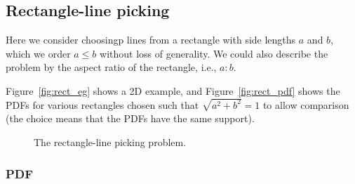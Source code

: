 \subsection{Rectangle-line picking}
\label{sec:rectangle_line}


Here we consider choosingp lines from a rectangle with side lengths
$a$ and $b$, which we order $a \leq b$ without loss of generality. 
We could also describe the problem by the aspect ratio of the
rectangle, i.e., $a:b$.

Figure~\ref{fig:rect_eg} shows a 2D example, and
Figure~\ref{fig:rect_pdf} shows the PDFs for various rectangles chosen
such that $\sqrt{a^2 + b^2} = 1$ to allow comparison (the choice means
that the PDFs have the same support).

\begin{figure}[tbp]
  \begin{center}
    \hspace{6mm}
    \caption{The rectangle-line picking problem.}
  \end{center} 
\vspace{-4mm}
\end{figure}

\subsubsection{PDF}

